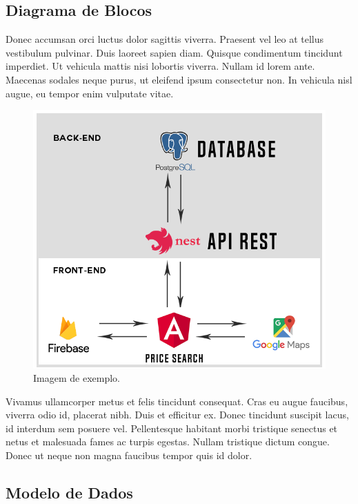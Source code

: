 \subsection{Diagrama de Blocos}

 Donec accumsan orci luctus dolor sagittis viverra. Praesent vel leo at tellus vestibulum pulvinar. Duis laoreet sapien diam. Quisque condimentum tincidunt imperdiet. Ut vehicula mattis nisi lobortis viverra. Nullam id lorem ante. Maecenas sodales neque purus, ut eleifend ipsum consectetur non. In vehicula nisl augue, eu tempor enim vulputate vitae.
 
\begin{figure}[!htb]
\centering
\caption{Imagem de exemplo.}
\includegraphics[width=\linewidth]{figuras/diagrama_de_blocos.png}
\end{figure}
 
 Vivamus ullamcorper metus et felis tincidunt consequat. Cras eu augue faucibus, viverra odio id, placerat nibh. Duis et efficitur ex. Donec tincidunt suscipit lacus, id interdum sem posuere vel. Pellentesque habitant morbi tristique senectus et netus et malesuada fames ac turpis egestas. Nullam tristique dictum congue. Donec ut neque non magna faucibus tempor quis id dolor. 

\subsection{Modelo de Dados}
 
